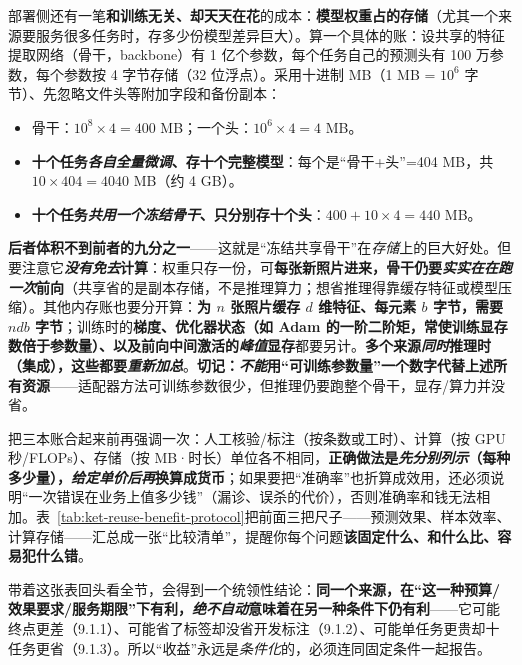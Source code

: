 部署侧还有一笔\textbf{和训练无关、却天天在花}的成本：\textbf{模型权重占的存储}（尤其一个来源要服务很多任务时，存多少份模型差异巨大）。算一个具体的账：设共享的特征提取网络（骨干，backbone）有 1 亿个参数，每个任务自己的预测头有 100 万参数，每个参数按 4 字节存储（32 位浮点）。采用十进制 MB（1 MB = $10^6$ 字节）、先忽略文件头等附加字段和备份副本：
\begin{itemize}\item 骨干：$10^8\times4=400$ MB；一个头：$10^6\times4=4$ MB。\item \textbf{十个任务\emph{各自全量微调}、存十个完整模型}：每个是“骨干+头”=404 MB，共 $10\times404=4040$ MB（约 4 GB）。\item \textbf{十个任务\emph{共用一个冻结骨干}、只分别存十个头}：$400+10\times4=440$ MB。\end{itemize}
\textbf{后者体积不到前者的九分之一}——这就是“冻结共享骨干”在\emph{存储}上的巨大好处。但要注意它\textbf{\emph{没有免去}计算}：权重只存一份，可\textbf{每张新照片进来，骨干仍要\emph{实实在在跑一次}前向}（共享省的是副本存储，不是推理算力；想省推理得靠缓存特征或模型压缩）。其他内存账也要分开算：\textbf{为 $n$ 张照片缓存 $d$ 维特征、每元素 $b$ 字节，需要 $ndb$ 字节}；训练时的\textbf{梯度、优化器状态（如 Adam 的一阶二阶矩，常使训练显存数倍于参数量）、以及前向中间激活的\emph{峰值}显存}都要另计。\textbf{多个来源\emph{同时}推理时（集成），这些都要\emph{重新加总}}。\textbf{切记：\emph{不能}用“可训练参数量”一个数字代替上述所有资源}——适配器方法可训练参数很少，但推理仍要跑整个骨干，显存/算力并没省。

把三本账合起来前再强调一次：人工核验/标注（按条数或工时）、计算（按 GPU 秒/FLOPs）、存储（按 MB·时长）单位各不相同，\textbf{正确做法是\emph{先分别列示}（每种多少量），\emph{给定单价后}\emph{再}换算成货币}；如果要把“准确率”也折算成效用，还必须说明“一次错误在业务上值多少钱”（漏诊、误杀的代价），否则准确率和钱无法相加。表~\ref{tab:ket-reuse-benefit-protocol}把前面三把尺子——预测效果、样本效率、计算存储——汇总成一张“比较清单”，提醒你每个问题\textbf{该固定什么、和什么比、容易犯什么错}。

带着这张表回头看全节，会得到一个统领性结论：\textbf{\textbf{同一个来源，在“这一种预算/效果要求/服务期限”下有利，\emph{绝不自动}意味着在另一种条件下仍有利}}——它可能终点更差（9.1.1）、可能省了标签却没省开发标注（9.1.2）、可能单任务更贵却十任务更省（9.1.3）。所以“收益”永远是\emph{条件化}的，必须连同固定条件一起报告。

